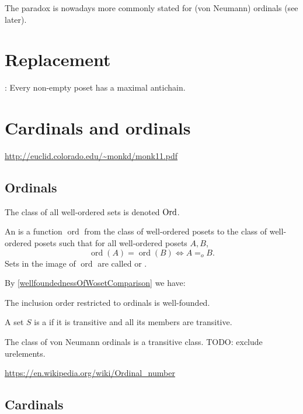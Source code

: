 The paradox is nowadays more commonly stated for (von Neumann) ordinals (see later).




\chapter{Replacement}

: Every non-empty poset has a maximal antichain.

\chapter{Cardinals and ordinals}
\url{http://euclid.colorado.edu/~monkd/monk11.pdf}

\section{Ordinals}
\begin{definition}
The class of all well-ordered sets is denoted $\operatorname{Ord}$.
\end{definition}

\begin{definition}
An  is a function $\operatorname{ord}$ from the class of well-ordered posets to the class of well-ordered posets such that for all well-ordered posets $A,B$,
\[ \operatorname{ord}(A) = \operatorname{ord}(B) \iff A =_o B. \]
Sets in the image of $\operatorname{ord}$ are called  or .
\end{definition}
By \ref{wellfoundednessOfWosetComparison} we have:
\begin{lemma}
The inclusion order restricted to ordinals is well-founded.
\end{lemma}

\begin{definition}
A set $S$ is a  if it is transitive and all its members are transitive.
\end{definition}
The class of von Neumann ordinals is a transitive class. TODO: exclude urelements.

\url{https://en.wikipedia.org/wiki/Ordinal_number}

\section{Cardinals}

